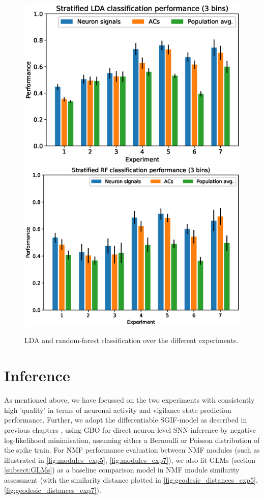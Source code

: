 \documentclass[mphil,deptreport,ianc]{infthesis} %
\begin{document}
\begin{figure}
    \centering
    \includegraphics[width=0.7\columnwidth]{figures/LDA/bars_LDA_per_signal_t_3.eps}
    \includegraphics[width=0.7\columnwidth]{figures/LDA/bars_RF_per_signal_t_3.eps}
    \caption{LDA and random-forest classification over the different experiments.}
    \label{fig:lda_rf_classification}
\end{figure}


\clearpage
\section{Inference}

As mentioned above, we have focussed on the two experiments with consistently high 'quality' in terms of neuronal activity and vigilance state prediction performance.
Further, we adopt the differentiable SGIF-model as described in previous chapters \cite{Rene2020}, using GBO for direct neuron-level SNN inference by negative log-likelihood minimisation, assuming either a Bernoulli or Poisson distribution of the spike train.
For NMF performance evaluation between NMF modules (such as illustrated in \ref{fig:modules_exp5}, \ref{fig:modules_exp7}), we also fit GLMs (section \ref{subsect:GLMs}) as a baseline comparison model in NMF module similarity assessment (with the similarity distance plotted in \ref{fig:geodesic_distances_exp5}, \ref{fig:geodesic_distances_exp7}).
\end{document}
